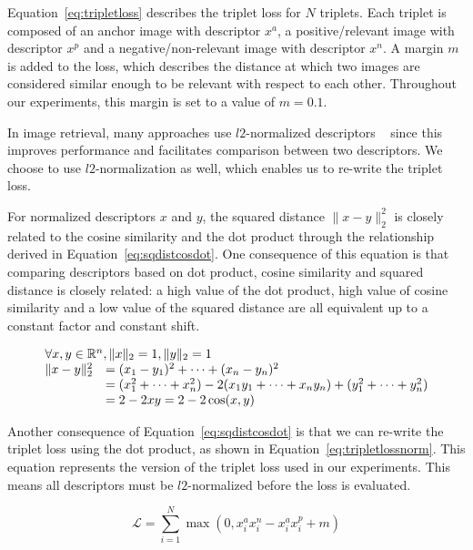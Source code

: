 Equation~\ref{eq:tripletloss} describes the triplet loss for $N$
triplets. Each triplet is composed of an anchor image with descriptor
$x^a$, a positive/relevant image with descriptor $x^p$ and a
negative/non-relevant image with descriptor $x^n$. A margin $m$ is added
to the loss, which describes the distance at which two images are
considered similar enough to be relevant with respect to each other.
Throughout our experiments, this margin is set to a value of $m=0.1$.

In image retrieval, many approaches use $l2$-normalized descriptors
~\cite{jegou_hamming_2008,jegou_aggregating_2010,tolias_particular_2015,gordo_deep_2016} since this improves performance and facilitates comparison
between two descriptors. We choose to use $l2$-normalization as well,
which enables us to re-write the triplet loss.

For normalized descriptors $x$ and $y$, the squared distance $\| x - y \|_2^2$
is closely related to the cosine similarity and the dot product through
the relationship derived in Equation~\ref{eq:sqdistcosdot}. One consequence
of this equation is that comparing descriptors based on dot product,
cosine similarity and squared distance is closely related: a high value
of the dot product, high value of cosine similarity and a low value of
the squared distance are all equivalent up to a constant factor and
constant shift.

\begin{equation}\label{eq:sqdistcosdot}
\begin{array}{ll}
\multicolumn{2}{l}{\forall x, y \in \mathbb{R}^n, \|x\|_2 = 1, \|y\|_2 = 1}\\
\|x-y\|_2^2 &= (x_1-y_1)^2 + \dots + (x_n-y_n)^2\\
&=(x_1^2 + \dots + x_n^2) - 2(x_1y_1 + \dots + x_ny_n) +
(y_1^2 + \dots + y_n^2)\\
&=2 - 2xy = 2 - 2\cos(x, y)
\end{array}
\end{equation}

Another consequence of Equation~\ref{eq:sqdistcosdot} is that we can re-write the triplet loss using the dot product, as shown in Equation~\ref{eq:tripletlossnorm}.
This equation represents the version of the triplet loss used in
our experiments. This means all descriptors must be $l2$-normalized before
the loss is evaluated.

\begin{equation}\label{eq:tripletlossnorm}
\mathcal{L} = \sum_{i=1}^N
\max(0, x^a_i x^n_i - x^a_i x^p_i + m)
\end{equation}

